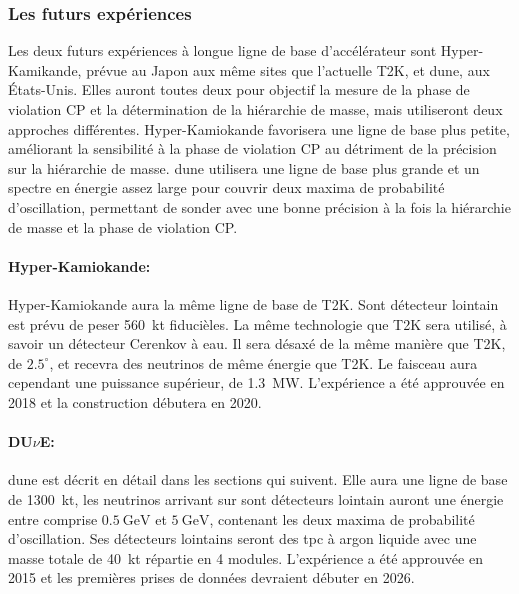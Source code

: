             \subsubsection{Les futurs expériences}
            
            Les deux futurs expériences à longue ligne de base d'accélérateur sont Hyper-Kamikande, prévue au Japon aux même sites que l'actuelle T2K, et \gls{dune}, aux États-Unis. Elles auront toutes deux pour objectif la mesure de la phase de violation CP et la détermination de la hiérarchie de masse, mais utiliseront deux approches différentes. Hyper-Kamiokande favorisera une ligne de base plus petite, améliorant la sensibilité à la phase de violation CP au détriment de la précision sur la hiérarchie de masse. \gls{dune} utilisera une ligne de base plus grande et un spectre en énergie assez large pour couvrir deux maxima de probabilité d'oscillation, permettant de sonder avec une bonne précision à la fois la hiérarchie de masse et la phase de violation CP.
            
            \paragraph{Hyper-Kamiokande\cite{hyper-k}:} Hyper-Kamiokande aura la même ligne de base de T2K. Sont détecteur lointain est prévu de peser \SI{560}{\kilo\tonne} fiducièles. La même technologie que T2K sera utilisé, à savoir un détecteur Cerenkov à eau. Il sera désaxé de la même manière que T2K, de $2.5^{\circ}$, et recevra des neutrinos de même énergie que T2K. Le faisceau aura cependant une puissance supérieur, de \SI{1.3}{\mega\watt}. L'expérience a été approuvée en 2018 et la construction débutera en 2020.
            
            \paragraph{DU$\nu$E\cite{Acciarri2016}:} \gls{dune} est décrit en détail dans les sections qui suivent. Elle aura une ligne de base de \SI{1300}{\kilo\tonne}, les neutrinos arrivant sur sont détecteurs lointain auront une énergie entre comprise $\SI{0.5}{\giga\electronvolt}$ et $\SI{5}{\giga\electronvolt}$, contenant les deux maxima de probabilité d'oscillation. Ses détecteurs lointains seront des \gls{tpc} à argon liquide avec une masse totale de \SI{40}{\kilo\tonne} répartie en 4 modules. L'expérience a été approuvée en 2015 et les premières prises de données devraient débuter en 2026.
            
